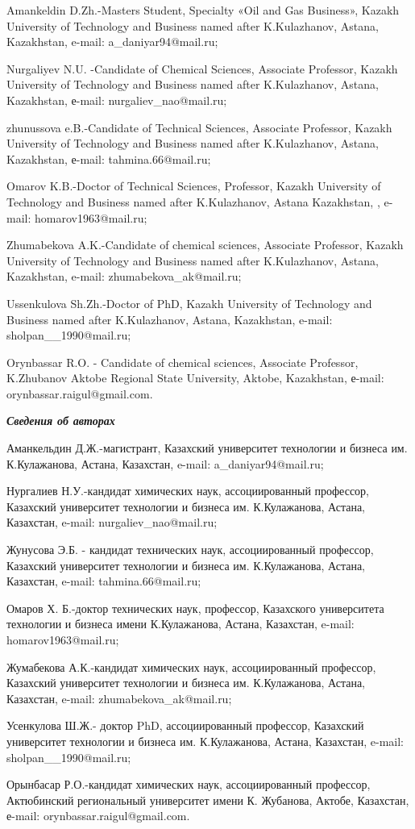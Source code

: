 \begin{noparindent}
Amankeldin D.Zh.-Master\textquotesingle s Student, Specialty «Oil and
Gas Business», Kazakh University of Technology and Business named after
K.Kulazhanov, Astana, Kazakhstan, e-mail: a\_daniyar94@mail.ru;

Nurgaliyev N.U. -Candidate of Chemical Sciences, Associate Professor,
Kazakh University of Technology and Business named after K.Kulazhanov,
Astana, Kazakhstan, е-mail: nurgaliev\_nao@mail.ru;

zhunussova e.B.-Candidate of Technical Sciences, Associate Professor,
Kazakh University of Technology and Business named after K.Kulazhanov,
Astana, Kazakhstan, е-mail: tahmina.66@mail.ru;

Omarov K.B.-Doctor of Technical Sciences, Professor, Kazakh University
of Technology and Business named after K.Kulazhanov, Astana Kazakhstan,
, e-mail: homarov1963@mail.ru;

Zhumabekova A.K.-Candidate of chemical sciences, Associate Professor,
Kazakh University of Technology and Business named after K.Kulazhanov,
Astana, Kazakhstan, e-mail: zhumabekova\_ak@mail.ru;

Ussenkulova Sh.Zh.-Doctor of PhD, Kazakh University of Technology and
Business named after K.Kulazhanov, Astana, Kazakhstan, e-mail:
sholpan\_\_1990@mail.ru;

Orynbassar R.O. - Candidate of chemical sciences, Associate Professor,
K.Zhubanov Aktobe Regional State University, Aktobe, Kazakhstan, е-mail:
orynbassar.raigul@gmail.com.
\end{noparindent}

\emph{{\bfseries Сведения об авторах}}

\begin{noparindent}
Аманкельдин Д.Ж.-магистрант, Казахский университет технологии и бизнеса
им. К.Кулажанова, Астана, Казахстан, e-mail: a\_daniyar94@mail.ru;

Нургалиев Н.У.-кандидат химических наук, ассоциированный профессор,
Казахский университет технологии и бизнеса им. К.Кулажанова, Астана,
Казахстан, e-mail: nurgaliev\_nao@mail.ru;

Жунусова Э.Б. - кандидат технических наук, ассоциированный профессор,
Казахский университет технологии и бизнеса им. К.Кулажанова, Астана,
Казахстан, e-mail: tahmina.66@mail.ru;

Омаров Х. Б.-доктор технических наук, профессор, Казахского университета
технологии и бизнеса имени К.Кулажанова, Астана, Казахстан, e-mail:
homarov1963@mail.ru;

Жумабекова А.К.-кандидат химических наук, ассоциированный профессор,
Казахский университет технологии и бизнеса им. К.Кулажанова, Астана,
Казахстан, e-mail: zhumabekova\_ak@mail.ru;

Усенкулова Ш.Ж.- доктор PhD, ассоциированный профессор, Казахский
университет технологии и бизнеса им. К.Кулажанова, Астана, Казахстан,
e-mail: sholpan\_\_1990@mail.ru;

Орынбасар Р.О.-кандидат химических наук, ассоциированный профессор,
Актюбинский региональный университет имени К. Жубанова, Актобе,
Казахстан, е-mail: orynbassar.raigul@gmail.com.
\end{noparindent}
